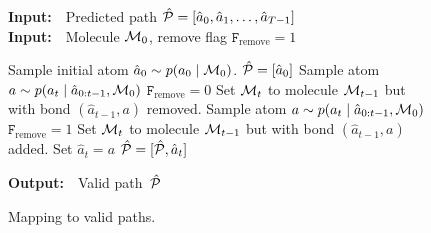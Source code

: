 \begin{wrapfigure}{R}{0.5\textwidth}
\begin{minipage}{0.5\textwidth}
\begin{algorithm}[H]
  \caption{Mapping to valid paths.}
  {\bf Input:}~~Predicted path $\hat{{\mathcal{P}}} = [\hat{a}_0, \hat{a}_1, \ldots, \hat{a}_{T-1}]$\\
  {\bf Input:}~~Molecule ${\mathcal{M}}_0$, remove flag $\texttt{F}_\textrm{remove} \!=\!1$
  
  \begin{algorithmic}[1]
  	\STATE Sample initial atom $\hat{a}_0 \sim p(a_0 \mid {\mathcal{M}}_0)$.
    \STATE $\hat{{\mathcal{P}}} = [\hat{a}_0]$%
    		\STATE Sample atom $a \sim p(a_t \mid \hat{a}_{0:t-1}, {\mathcal{M}}_0)$%
            	\STATE $\texttt{F}_\textrm{remove} = 0$
            \ENDIF
            \STATE Set ${\mathcal{M}}_t$ to molecule ${\mathcal{M}}_{t-1}$ but with bond $(\hat{a}_{t-1}, a)$ removed.
        \ELSE
        	\STATE Sample atom $a \sim p(a_t \mid \hat{a}_{0:t-1}, {\mathcal{M}}_0)$
            	\STATE $\texttt{F}_\textrm{remove} = 1$
            \ENDIF
            \STATE Set ${\mathcal{M}}_t$ to molecule ${\mathcal{M}}_{t-1}$ but with bond $(\hat{a}_{t-1}, a)$ added.
   		\ENDIF
        \STATE Set $\hat{a}_t = a$
        \STATE $\hat{{\mathcal{P}}} = [\hat{{\mathcal{P}}}, \hat{a}_t]$
    \ENDFOR
  \end{algorithmic}
  {\bf Output:}~~Valid path~$\hat{{\mathcal{P}}}$
  \label{algo:valid_path}
\end{algorithm}
\end{minipage}
\end{wrapfigure}